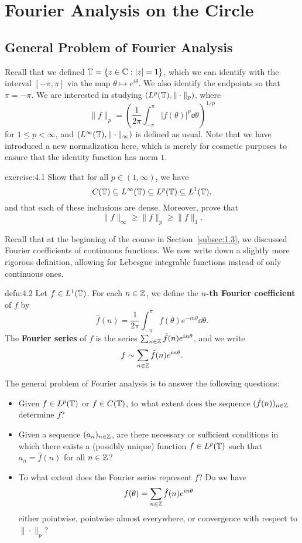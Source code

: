 \section{Fourier Analysis on the Circle} \label{sec:4}

\subsection{General Problem of Fourier Analysis} \label{subsec:4.1}
Recall that we defined $\mathbb{T} = \{z \in \mathbb{C} : |z| = 1\}$, which we can 
identify with the interval $[-\pi, \pi]$ via the map $\theta \mapsto 
e^{i\theta}$. We also identify the endpoints so that $\pi = -\pi$. 
We are interested in studying $(L^p(\mathbb{T}), \|\cdot\|_p)$, where
\[ \|f\|_p = \left( \frac{1}{2\pi} \int_{-\pi}^\pi |f(\theta)|^p \dd\theta 
\right)^{\!1/p} \]
for $1 \leq p < \infty$, and $(L^\infty(\mathbb{T}), \|\cdot\|_\infty)$ is defined 
as usual. Note that we have introduced a new normalization here, which is 
merely for cosmetic purposes to ensure that the identity function 
has norm $1$. 

\begin{exercise}{exercise:4.1}
    Show that for all $p \in (1, \infty)$, we have 
    \[ C(\mathbb{T}) \subseteq L^\infty(\mathbb{T}) \subseteq L^p(\mathbb{T}) \subseteq L^1(\mathbb{T}), \] 
    and that each of these inclusions are dense. Moreover, prove that 
    \[ \|f\|_\infty \geq \|f\|_p \geq \|f\|_1. \]  
\end{exercise}

Recall that at the beginning of the course in Section~\ref{subsec:1.3}, we 
discussed Fourier coefficients of continuous functions. We now write down a 
slightly more rigorous definition, allowing for Lebesgue integrable 
functions instead of only continuous ones.

\begin{defn}{defn:4.2}
    Let $f \in L^1(\mathbb{T})$. For each $n \in \mathbb{Z}$, we define the {\bf $n$-th 
    Fourier coefficient} of $f$ by 
    \[ \hat f(n) = \frac1{2\pi} \int_{-\pi}^\pi f(\theta) e^{-in\theta} \dd\theta. \] 
    The {\bf Fourier series} of $f$ is the series $\sum_{n\in\mathbb{Z}} \hat f(n) 
    e^{in\theta}$, and we write 
    \[ f \sim \sum_{n\in\mathbb{Z}} \hat f(n) e^{in\theta}. \] 
\end{defn}

The general problem of Fourier analysis is to answer the following questions: 
\begin{itemize}
    \item Given $f \in L^p(\mathbb{T})$ or $f \in C(\mathbb{T})$, to what extent does the 
    sequence $(\hat f(n))_{n\in\mathbb{Z}}$ determine $f$? 
    \item Given a sequence $(a_n)_{n\in\mathbb{Z}}$, are there necessary or sufficient 
    conditions in which there exists a (possibly unique) function $f \in 
    L^p(\mathbb{T})$ such that $a_n = \hat f(n)$ for all $n \in \mathbb{Z}$? 
    \item To what extent does the Fourier series represent $f$? Do we have 
    \[ f(\theta) = \sum_{n\in\mathbb{Z}} \hat f(n) e^{in\theta} \] 
    either pointwise, pointwise almost everywhere, or convergence with 
    respect to $\|\cdot\|_p$? 
\end{itemize}

